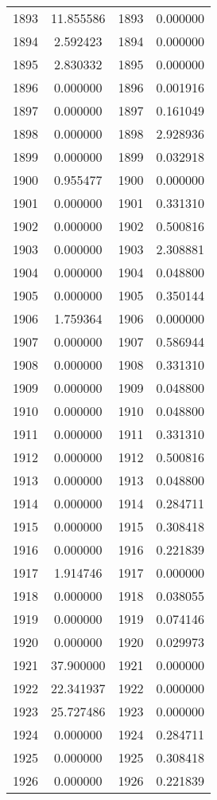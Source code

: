 \documentclass[12pt]{article}
\begin{document}
\begin{longtable}{@{}cccc@{}}
1893 & 11.855586 & 1893 & 0.000000 \\
1894 & 2.592423 & 1894 & 0.000000 \\
1895 & 2.830332 & 1895 & 0.000000 \\
1896 & 0.000000 & 1896 & 0.001916 \\
1897 & 0.000000 & 1897 & 0.161049 \\
1898 & 0.000000 & 1898 & 2.928936 \\
1899 & 0.000000 & 1899 & 0.032918 \\
1900 & 0.955477 & 1900 & 0.000000 \\
1901 & 0.000000 & 1901 & 0.331310 \\
1902 & 0.000000 & 1902 & 0.500816 \\
1903 & 0.000000 & 1903 & 2.308881 \\
1904 & 0.000000 & 1904 & 0.048800 \\
1905 & 0.000000 & 1905 & 0.350144 \\
1906 & 1.759364 & 1906 & 0.000000 \\
1907 & 0.000000 & 1907 & 0.586944 \\
1908 & 0.000000 & 1908 & 0.331310 \\
1909 & 0.000000 & 1909 & 0.048800 \\
1910 & 0.000000 & 1910 & 0.048800 \\
1911 & 0.000000 & 1911 & 0.331310 \\
1912 & 0.000000 & 1912 & 0.500816 \\
1913 & 0.000000 & 1913 & 0.048800 \\
1914 & 0.000000 & 1914 & 0.284711 \\
1915 & 0.000000 & 1915 & 0.308418 \\
1916 & 0.000000 & 1916 & 0.221839 \\
1917 & 1.914746 & 1917 & 0.000000 \\
1918 & 0.000000 & 1918 & 0.038055 \\
1919 & 0.000000 & 1919 & 0.074146 \\
1920 & 0.000000 & 1920 & 0.029973 \\
1921 & 37.900000 & 1921 & 0.000000 \\
1922 & 22.341937 & 1922 & 0.000000 \\
1923 & 25.727486 & 1923 & 0.000000 \\
1924 & 0.000000 & 1924 & 0.284711 \\
1925 & 0.000000 & 1925 & 0.308418 \\
1926 & 0.000000 & 1926 & 0.221839 \\

\end{longtable}
\end{document}
